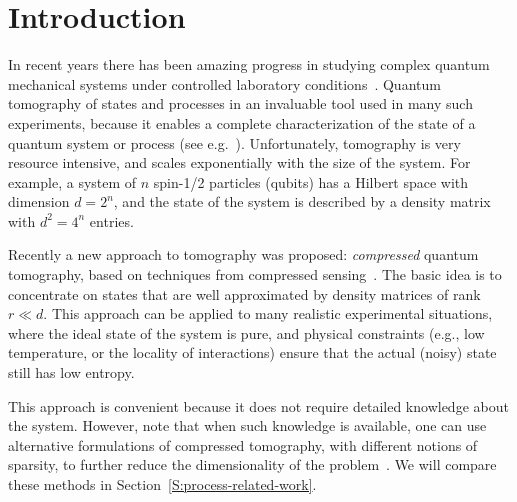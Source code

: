
\section{Introduction}


In recent years there has been amazing progress in studying complex quantum mechanical systems under controlled laboratory conditions~\cite{Nature2008}. Quantum tomography of states and processes in an invaluable tool used in many such experiments, because it enables a complete characterization of the state of a quantum system or process (see e.g.~\cite{Smithey1993, Altepeter2003, OBrien2003, OBrien2004, Roos2004, Resch2005, Haffner2005, Myrskog2005, Smith2006, Riebe2006, Filipp2009, Medendorp2011, Barreiro2011, Fedorov2012, Liu2012}). Unfortunately, tomography is very resource intensive, and scales exponentially with the size of the system.  For example, a system of $n$ spin-1/2 particles (qubits) has a Hilbert space with dimension $d = 2^n$, and the state of the system is described by a density matrix with $d^2 = 4^n$ entries.

Recently a new approach to tomography was proposed:
\textit{compressed} quantum tomography, based on techniques from
compressed sensing~\cite{Gross2010,Gross2011}. The basic idea is to concentrate
on states that are well approximated by density matrices of rank $r \ll
d$.  
This approach can be applied to many realistic experimental situations, 
where the ideal state of the system is pure, and physical constraints 
(e.g., low temperature, or the locality of interactions) ensure that 
the actual (noisy) state still has low entropy. 

This approach is convenient because it does not require detailed knowledge 
about the system. However, note that when such knowledge is available, 
one can use alternative formulations of compressed tomography,
with different notions of sparsity, to further reduce the dimensionality of the
problem~\cite{Shabani2011}. We will compare these methods in
Section~\ref{S:process-related-work}.  

